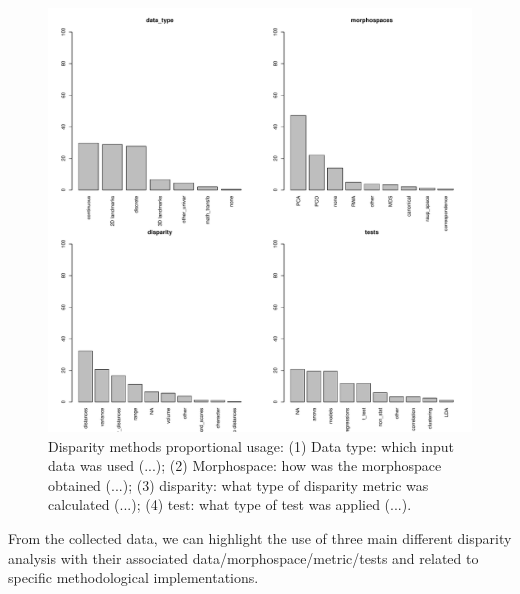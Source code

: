 \documentclass[12pt,letterpaper]{article}
\begin{document}
\begin{figure}[!htbp]
\centering
   \includegraphics[width=1\textwidth]{Figures/MethodsProportions.pdf} 
\caption{Disparity methods proportional usage: (1) Data type: which input data was used (...); (2) Morphospace: how was the morphospace obtained (...); (3) disparity: what type of disparity metric was calculated (...); (4) test: what type of test was applied (...).}
\label{Fig:MethodsProportions}
\end{figure}

From the collected data, we can highlight the use of three main different disparity analysis with their associated data/morphospace/metric/tests and related to specific methodological implementations.
\end{document}
